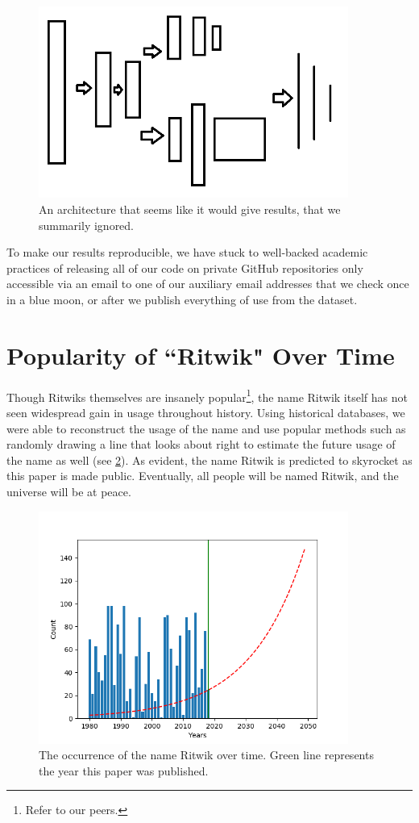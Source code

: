 \documentclass[]{article}
\begin{document}
\begin{figure}[h]
	\centering
	\includegraphics[width=4in]{figures/Neuralnet}
	\caption{An architecture that seems like it would give results, that we summarily ignored.}
	\label{fig:neuralnet}
\end{figure}

To make our results reproducible, we have stuck to well-backed academic practices of releasing all of our code on private GitHub repositories only accessible via an email to one of our auxiliary email addresses that we check once in a blue moon, or after we publish everything of use from the dataset.

\section{Popularity of ``Ritwik" Over Time}
Though Ritwiks themselves are insanely popular\footnote{Refer to our peers.}, the name Ritwik itself has not seen widespread gain in usage throughout history. Using historical databases, we were able to reconstruct the usage of the name and use popular methods such as randomly drawing a line that looks about right to estimate the future usage of the name as well (see \ref{fig:usageofritwik}). As evident, the name Ritwik is predicted to skyrocket as this paper is made public. Eventually, all people will be named Ritwik, and the universe will be at peace.
\begin{figure}[h]
	\centering
	\includegraphics[width=4in]{figures/UsageOfRitwik}
	\caption{The occurrence of the name Ritwik over time. Green line represents the year this paper was published.}
	\label{fig:usageofritwik}
\end{figure}
\end{document}
